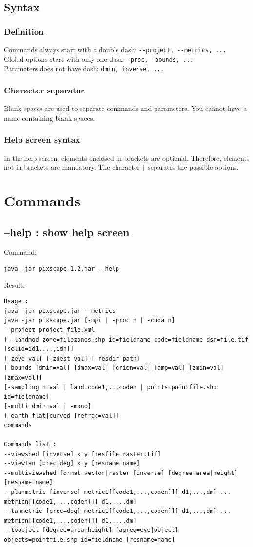 \documentclass{report}
\begin{document}
\subsection{Syntax}
\subsubsection{Definition}
Commands always start with a double dash: \verb|--project, --metrics, ...|\\
Global options start with only one dash: \verb|-proc, -bounds, ...|\\
Parameters does not have dash: \verb|dmin, inverse, ...|

\subsubsection{Character separator}
Blank spaces are used to separate commands and parameters.  You cannot have a name containing blank spaces.

\subsubsection{Help screen syntax}
In the help screen, elements enclosed in brackets are optional. Therefore, elements not in brackets are mandatory. The character \verb+|+ separates the possible options.

\section{Commands}

\subsection{--help : show help screen}
Command:
\begin{Verbatim}
java -jar pixscape-1.2.jar --help
\end{Verbatim}
Result:
\begin{Verbatim}
Usage :
java -jar pixscape.jar --metrics
java -jar pixscape.jar [-mpi | -proc n | -cuda n]
--project project_file.xml
[--landmod zone=filezones.shp id=fieldname code=fieldname dsm=file.tif [selid=id1,...,idn]]
[-zeye val] [-zdest val] [-resdir path]
[-bounds [dmin=val] [dmax=val] [orien=val] [amp=val] [zmin=val] [zmax=val]]
[-sampling n=val | land=code1,..,coden | points=pointfile.shp id=fieldname]
[-multi dmin=val | -mono]
[-earth flat|curved [refrac=val]]
commands

Commands list :
--viewshed [inverse] x y [resfile=raster.tif]
--viewtan [prec=deg] x y [resname=name]
--multiviewshed format=vector|raster [inverse] [degree=area|height] [resname=name]
--planmetric [inverse] metric1[[code1,...,coden]][_d1,...,dm] ... metricn[[code1,...,coden]][_d1,...,dm]
--tanmetric [prec=deg] metric1[[code1,...,coden]][_d1,...,dm] ... metricn[[code1,...,coden]][_d1,...,dm]
--toobject [degree=area|height] [agreg=eye|object] objects=pointfile.shp id=fieldname [resname=name]
\end{Verbatim}
\end{document}
